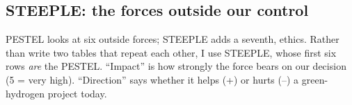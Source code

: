 \newpage
{}

\subsection{STEEPLE: the forces outside our control}

PESTEL looks at six outside forces; STEEPLE adds a seventh, ethics. Rather than write two tables that repeat each other, I use STEEPLE, whose first six rows \emph{are} the PESTEL. ``Impact'' is how strongly the force bears on our decision (5 = very high). ``Direction'' says whether it helps (+) or hurts (–) a green-hydrogen project today.

